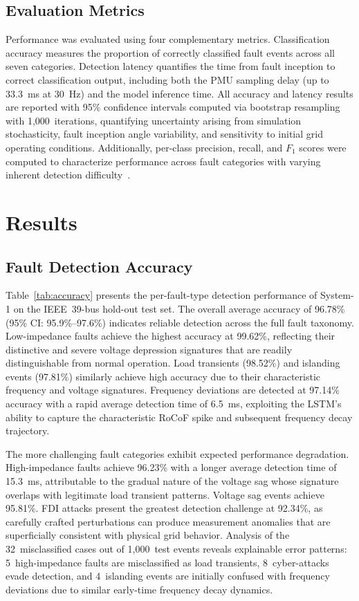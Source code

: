 \documentclass[journal]{IEEEtran}
\begin{document}
\subsection{Evaluation Metrics}

Performance was evaluated using four complementary metrics. Classification accuracy measures the proportion of correctly classified fault events across all seven categories. Detection latency quantifies the time from fault inception to correct classification output, including both the PMU sampling delay (up to 33.3~ms at 30~Hz) and the model inference time. All accuracy and latency results are reported with 95\% confidence intervals computed via bootstrap resampling with 1,000~iterations, quantifying uncertainty arising from simulation stochasticity, fault inception angle variability, and sensitivity to initial grid operating conditions. Additionally, per-class precision, recall, and $F_1$ scores were computed to characterize performance across fault categories with varying inherent detection difficulty~\cite{ref36}.

\section{Results}
\label{sec:results}

\subsection{Fault Detection Accuracy}

Table~\ref{tab:accuracy} presents the per-fault-type detection performance of System-1 on the IEEE~39-bus hold-out test set. The overall average accuracy of 96.78\% (95\% CI: 95.9\%--97.6\%) indicates reliable detection across the full fault taxonomy. Low-impedance faults achieve the highest accuracy at 99.62\%, reflecting their distinctive and severe voltage depression signatures that are readily distinguishable from normal operation. Load transients (98.52\%) and islanding events (97.81\%) similarly achieve high accuracy due to their characteristic frequency and voltage signatures. Frequency deviations are detected at 97.14\% accuracy with a rapid average detection time of 6.5~ms, exploiting the LSTM's ability to capture the characteristic RoCoF spike and subsequent frequency decay trajectory.

The more challenging fault categories exhibit expected performance degradation. High-impedance faults achieve 96.23\% with a longer average detection time of 15.3~ms, attributable to the gradual nature of the voltage sag whose signature overlaps with legitimate load transient patterns. Voltage sag events achieve 95.81\%. FDI attacks present the greatest detection challenge at 92.34\%, as carefully crafted perturbations can produce measurement anomalies that are superficially consistent with physical grid behavior. Analysis of the 32~misclassified cases out of 1,000~test events reveals explainable error patterns: 5~high-impedance faults are misclassified as load transients, 8~cyber-attacks evade detection, and 4~islanding events are initially confused with frequency deviations due to similar early-time frequency decay dynamics.
\end{document}
